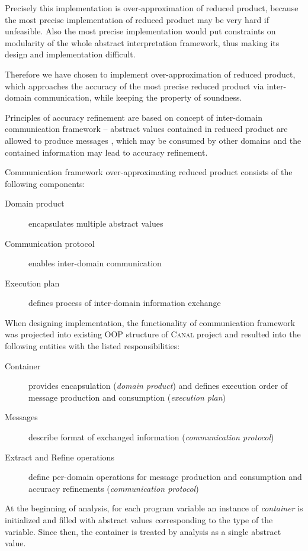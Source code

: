 \documentclass[12pt,oneside]{fithesis2}
\theoremstyle{definition}
\begin{document}
Precisely this implementation is over-approximation of reduced product, because the most precise implementation of reduced product may be very hard if unfeasible. Also the most precise implementation would put constraints on modularity of the whole abstract interpretation framework, thus making its design and implementation difficult.

Therefore we have chosen to implement over-approximation of reduced product, which approaches the accuracy of the most precise reduced product via inter-domain communication, while keeping the property of soundness.

Principles of accuracy refinement are based on concept of inter-domain communication framework -- abstract values contained in reduced product are allowed to produce messages , which may be consumed by other domains and the contained information may lead to accuracy refinement.

Communication framework over-approximating reduced product consists of the following components:

\begin{description}
  \item[Domain product] encapsulates multiple abstract values
  \item[Communication protocol] enables inter-domain communication
  \item[Execution plan] defines process of inter-domain information exchange
\end{description}

When designing implementation, the functionality of communication framework was projected into existing OOP structure of \textsc{Canal} project and resulted into the following entities with the listed responsibilities:

\begin{description}
  \item[Container] provides encapsulation (\textit{domain product}) and defines execution order of message production and consumption (\textit{execution plan})
  \item[Messages] describe format of exchanged information (\textit{communication protocol})
  \item[Extract and Refine operations] define per-domain operations for message production and consumption and accuracy refinements (\textit{communication protocol})
\end{description}

At the beginning of analysis, for each program variable an instance of \textit{container} is initialized and filled with abstract values corresponding to the type of the variable. Since then, the container is treated by analysis as a single abstract value.
\end{document}

